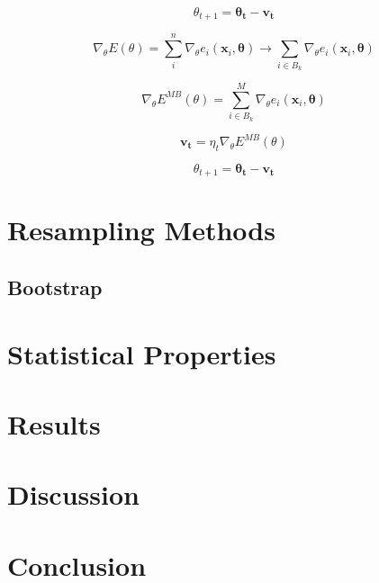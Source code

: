 \documentclass[a4paper,12pt, english]{article}
\begin{document}
\begin{equation}
\theta_{t+1} = \mathbf{\theta_t} - \mathbf{v_t}
\end{equation}

\begin{equation}
\nabla_{\theta} E(\theta) = \sum_i^n \nabla_{\theta} e_i(\mathbf{x}_i, \mathbf{\theta}) \longrightarrow \sum_{i \in B_k} \nabla_{\theta} e_i(\mathbf{x}_i, \mathbf{\theta})
\end{equation}

\begin{equation}
\nabla_{\theta} E^{MB} (\theta) = \sum_{i \in B_k}^M \nabla_{\theta} e_i(\mathbf{x}_i, \mathbf{\theta})
\end{equation}

\begin{equation}
\mathbf{v_t} = \eta_t \nabla_{\theta} E^{MB} (\theta)
\end{equation}

\begin{equation}
\theta_{t+1} = \mathbf{\theta_t} - \mathbf{v_t}
\end{equation}

\section{Resampling Methods}

\subsection{Bootstrap}

\section{Statistical Properties}

\section{Results}

\section{Discussion}

\section{Conclusion}

\newpage
\end{document}
